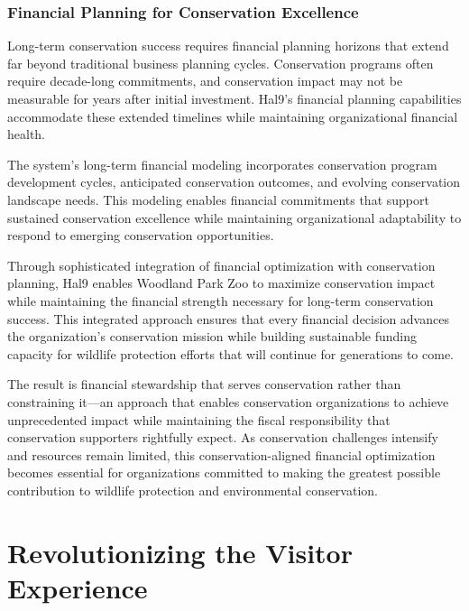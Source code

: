 \documentclass[
  Letterpaper,
]{scrbook}
\begin{document}
\subsection{Financial Planning for Conservation
Excellence}\label{financial-planning-for-conservation-excellence}

Long-term conservation success requires financial planning horizons that
extend far beyond traditional business planning cycles. Conservation
programs often require decade-long commitments, and conservation impact
may not be measurable for years after initial investment. Hal9's
financial planning capabilities accommodate these extended timelines
while maintaining organizational financial health.

The system's long-term financial modeling incorporates conservation
program development cycles, anticipated conservation outcomes, and
evolving conservation landscape needs. This modeling enables financial
commitments that support sustained conservation excellence while
maintaining organizational adaptability to respond to emerging
conservation opportunities.

Through sophisticated integration of financial optimization with
conservation planning, Hal9 enables Woodland Park Zoo to maximize
conservation impact while maintaining the financial strength necessary
for long-term conservation success. This integrated approach ensures
that every financial decision advances the organization's conservation
mission while building sustainable funding capacity for wildlife
protection efforts that will continue for generations to come.

The result is financial stewardship that serves conservation rather than
constraining it---an approach that enables conservation organizations to
achieve unprecedented impact while maintaining the fiscal responsibility
that conservation supporters rightfully expect. As conservation
challenges intensify and resources remain limited, this
conservation-aligned financial optimization becomes essential for
organizations committed to making the greatest possible contribution to
wildlife protection and environmental conservation.


\chapter{Revolutionizing the Visitor
Experience}\label{revolutionizing-the-visitor-experience}
\end{document}
